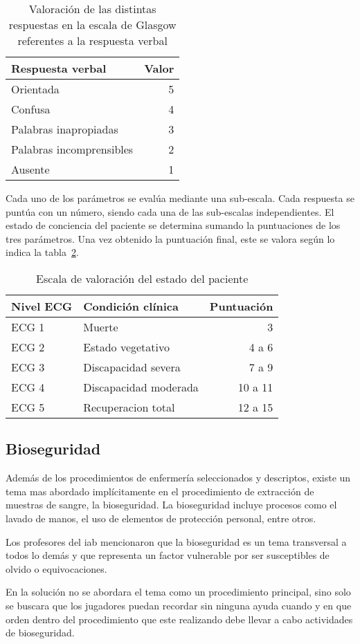 \begin{table}[!hbt]
\centering
\begin{tabular}{lr}
\toprule
\textbf{Respuesta verbal} & \textbf{Valor} \\
\midrule
Orientada & 5 \\
Confusa & 4 \\
Palabras inapropiadas & 3 \\
Palabras incomprensibles & 2 \\
Ausente & 1 \\
\bottomrule
\end{tabular}
\caption{Valoración de las distintas respuestas en la escala de Glasgow
    referentes a la respuesta verbal}
\label{tab:seleccion_glasgow_respuestas_verbal}
\end{table}

Cada uno de los parámetros se evalúa mediante una sub-escala. Cada respuesta se
puntúa con un número, siendo cada una de las sub-escalas independientes. El
estado de conciencia del paciente se determina sumando la puntuaciones de los
tres parámetros. Una vez obtenido la puntuación final, este se valora según lo
indica la tabla~\ref{tab:seleccion_glasgow_estado}.

\begin{table}[!hbt]
\centering
\begin{tabular}{llr}
\toprule
\textbf{Nivel ECG} & 
\textbf{Condición clínica} & 
\textbf{Puntuación} \\ 
\midrule
 ECG 1 & Muerte & 3 \\
 ECG 2 & Estado vegetativo & 4 a 6 \\
 ECG 3 & Discapacidad severa & 7 a 9 \\
 ECG 4 & Discapacidad moderada & 10 a 11 \\
 ECG 5 & Recuperacion total & 12 a 15 \\
\bottomrule
\end{tabular}
\caption{Escala de valoración del estado del paciente}
\label{tab:seleccion_glasgow_estado}
\end{table}

\subsection{Bioseguridad}

Además de los procedimientos de enfermería seleccionados y descriptos, existe un
tema mas abordado implícitamente en el procedimiento de extracción de muestras
de sangre, la bioseguridad. La bioseguridad incluye procesos como el lavado de
manos, el uso de elementos de protección personal, entre otros.

Los profesores del \Gls{iab} mencionaron que la bioseguridad es un tema
transversal a todos lo demás y que representa un factor vulnerable por ser
susceptibles de olvido o equivocaciones.

En la solución no se abordara el tema como un procedimiento principal, sino solo
se buscara que los jugadores puedan recordar sin ninguna ayuda cuando y en que
orden dentro del procedimiento que este realizando debe llevar a cabo
actividades de bioseguridad.
